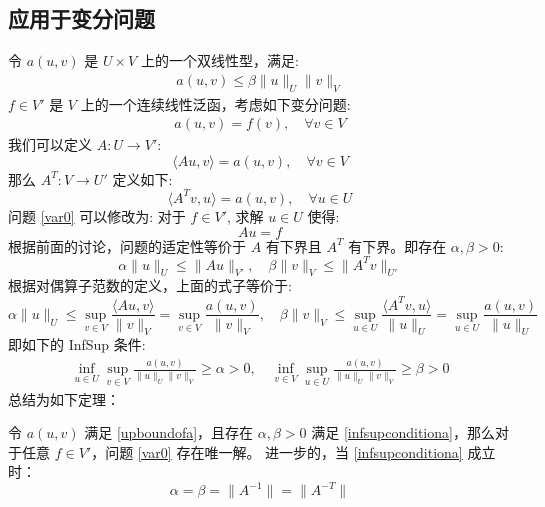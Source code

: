 \documentclass[lang=cn,a4paper,newtx]{elegantpaper}
\begin{document}
\subsection{应用于变分问题}
令 $a(u, v)$ 是 $U\times V$ 上的一个双线性型，满足:
\begin{align}
\label{upboundofa}
a(u, v) \leq \beta\|u\|_U\|v\|_V
\end{align}
$f\in V'$ 是 $V$ 上的一个连续线性泛函，考虑如下变分问题:
\begin{align}
\label{var0}
a(u, v) = f(v), \quad \forall v \in V
\end{align}
我们可以定义 $A: U \to V'$:
$$
\langle Au,  v\rangle = a(u, v), \quad \forall v \in V
$$
那么 $A^T: V \to U'$ 定义如下:
$$
\langle A^T v,  u\rangle = a(u, v), \quad \forall u \in U
$$
问题 \eqref{var0} 可以修改为: 对于 $f \in V'$, 求解 $u \in U$ 使得:
$$
Au = f
$$
根据前面的讨论，问题的适定性等价于 $A$ 有下界且 $A^T$ 有下界。即存在 $\alpha, \beta > 0$:
$$
\alpha\|u\|_U \leq \|Au\|_{V'}, \quad \beta\|v\|_V \leq \|A^Tv\|_{U'}
$$
根据对偶算子范数的定义，上面的式子等价于:
$$
\alpha\|u\|_U \leq \sup_{v\in V}\frac{ \langle Au,  v\rangle}{\|v\|_V} = 
\sup_{v\in V}\frac{a(u, v)}{\|v\|_V}, \quad
\beta\|v\|_V \leq \sup_{u\in U}\frac{ \langle A^Tv,  u\rangle}{\|u\|_U} =
\sup_{u\in U}\frac{a(u, v)}{\|u\|_U}
$$
即如下的 InfSup 条件:
\begin{align}
\label{infsupconditiona}
\inf_{u\in U}\sup_{v\in V}\frac{a(u, v)}{\|u\|_U\|v\|_V} \geq \alpha > 0, \quad
\inf_{v\in V}\sup_{u\in U}\frac{a(u, v)}{\|u\|_U\|v\|_V} \geq \beta > 0
\end{align}
总结为如下定理：
\begin{theorem}
    \label{thm:wellposednessa}
    令 $a(u, v)$ 满足 \eqref{upboundofa}，且存在 $\alpha, \beta > 0$ 满足
    \eqref{infsupconditiona}，那么对于任意 $f\in V'$，问题 \eqref{var0} 存在唯一解。
    进一步的，当 \eqref{infsupconditiona} 成立时：
    $$
    \alpha = \beta = \|A^{-1}\| = \|A^{-T}\|
    $$
\end{theorem}
\end{document}
